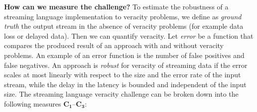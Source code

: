 %
%

\textbf{How can we measure the challenge?}
%
To estimate the robustness of a streaming language implementation to
veracity problems, we define as \emph{ground truth} the output stream
in the absence of veracity problems (for example data loss or delayed
data). Then we can quantify veracity. Let \emph{error} be a function
that compares the produced result of an approach with and without
veracity problems.  An example of an error function is the number of
false positives and false negatives.  An approach is \emph{robust} for
veracity of streaming data if the error scales at most linearly with
respect to the size and the error rate of the input stream, while the
delay in the latency is bounded and independent of the input size.
%
The streaming language veracity challenge can be broken down
into the following measures $\mathbf{C_1}$--$\mathbf{C_3}$:

